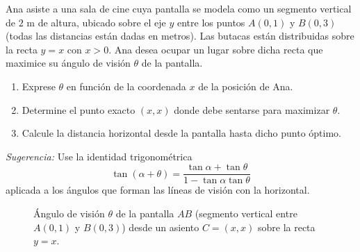 \begin{prob}
Ana asiste a una sala de cine cuya pantalla se modela como un segmento vertical de $2$ m de altura, ubicado sobre el eje $y$ entre los puntos $A(0,1)$ y $B(0,3)$ (todas las distancias están dadas en metros). Las butacas están distribuidas sobre la recta $y=x$ con $x>0$. Ana desea ocupar un lugar sobre dicha recta que maximice su ángulo de visión $\theta$ de la pantalla.

\begin{enumerate}
  \item Exprese $\theta$ en función de la coordenada $x$ de la posición de Ana.
  \item Determine el punto exacto $(x,x)$ donde debe sentarse para maximizar $\theta$.
  \item Calcule la distancia horizontal desde la pantalla hasta dicho punto óptimo.
\end{enumerate}

\textit{Sugerencia:} Use la identidad trigonométrica
\[
\tan(\alpha+\theta)=\frac{\tan\alpha+\tan\theta}{1-\tan\alpha\tan\theta}
\]
aplicada a los ángulos que forman las líneas de visión con la horizontal.

\begin{figure}[!htbp]
\centering
{}
\caption{Ángulo de visión $\theta$ de la pantalla $AB$ (segmento vertical
  entre $A(0,1)$ y $B(0,3)$) desde un asiento $C=(x,x)$ sobre la recta $y=x$.}
\label{fig:cine_angulo}
\end{figure}
\end{prob}

